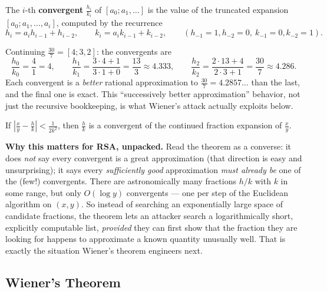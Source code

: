 \begin{definition}[Convergents]
The $i$-th \textbf{convergent} $\frac{h_i}{k_i}$ of $[a_0;a_1,\dots]$ is the value of the truncated expansion $[a_0;a_1,\dots,a_i]$, computed by the recurrence
\[
h_i = a_i h_{i-1} + h_{i-2}, \qquad k_i = a_i k_{i-1} + k_{i-2}, \qquad (h_{-1}{=}1, h_{-2}{=}0,\ k_{-1}{=}0, k_{-2}{=}1).
\]
\end{definition}

\begin{example}
Continuing $\frac{30}{7}=[4;3,2]$: the convergents are
\[
\frac{h_0}{k_0}=\frac{4}{1}=4, \qquad \frac{h_1}{k_1}=\frac{3\cdot4+1}{3\cdot1+0}=\frac{13}{3}\approx4.333, \qquad \frac{h_2}{k_2}=\frac{2\cdot13+4}{2\cdot3+1}=\frac{30}{7}\approx4.286.
\]
Each convergent is a \emph{better} rational approximation to $\frac{30}{7}=4.2857\dots$ than the last, and the final one is exact. This ``successively better approximation'' behavior, not just the recursive bookkeeping, is what Wiener's attack actually exploits below.
\end{example}

\begin{theorem}
If $\left|\frac{x}{y} - \frac{h}{k}\right| < \frac{1}{2k^2}$, then $\frac{h}{k}$ is a convergent of the continued fraction expansion of $\frac{x}{y}$.
\end{theorem}

\medskip\noindent\textbf{Why this matters for RSA, unpacked.} Read the theorem as a converse: it does \emph{not} say every convergent is a great approximation (that direction is easy and unsurprising); it says every \emph{sufficiently good} approximation \emph{must already be} one of the (few!) convergents. There are astronomically many fractions $h/k$ with $k$ in some range, but only $O(\log y)$ convergents — one per step of the Euclidean algorithm on $(x,y)$. So instead of searching an exponentially large space of candidate fractions, the theorem lets an attacker search a logarithmically short, explicitly computable list, \emph{provided} they can first show that the fraction they are looking for happens to approximate a known quantity unusually well. That is exactly the situation Wiener's theorem engineers next.

\subsection{Wiener's Theorem}

